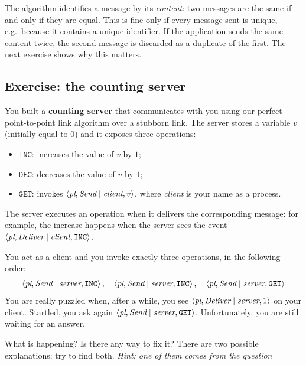 \begin{framedobs}{}
  The algorithm identifies a message by its \textit{content}: two messages are the same if and only if they are equal. This is fine only if every message sent is unique, e.g.\ because it contains a unique identifier. If the application sends the same content twice, the second message is discarded as a duplicate of the first. The next exercise shows why this matters.
\end{framedobs}

\subsection{Exercise: the counting server}

\begin{framedprob}[label={prob:counting-server}]{}
  You built a \textbf{counting server} that communicates with you using our perfect point-to-point link algorithm over a stubborn link. The server stores a variable $v$ (initially equal to $0$) and it exposes three operations:
  \begin{itemize}
    \item $\texttt{INC}$: increases the value of $v$ by $1$;
    \item $\texttt{DEC}$: decreases the value of $v$ by $1$;
    \item $\texttt{GET}$: invokes $\left\langle \textit{pl}, \textit{Send} \mid \textit{client}, v \right\rangle$, where \textit{client} is your name as a process.
  \end{itemize}
  The server executes an operation when it delivers the corresponding message: for example, the increase happens when the server sees the event $\left\langle \textit{pl}, \textit{Deliver} \mid \textit{client}, \texttt{INC} \right\rangle$.

  You act as a client and you invoke exactly three operations, in the following order:
  \[\left\langle \textit{pl}, \textit{Send} \mid \textit{server}, \texttt{INC} \right\rangle,\quad \left\langle \textit{pl}, \textit{Send} \mid \textit{server}, \texttt{INC} \right\rangle,\quad \left\langle \textit{pl}, \textit{Send} \mid \textit{server}, \texttt{GET} \right\rangle\]
  You are really puzzled when, after a while, you see $\left\langle \textit{pl}, \textit{Deliver} \mid \textit{server}, 1 \right\rangle$ on your client. Startled, you ask again $\left\langle \textit{pl}, \textit{Send} \mid \textit{server}, \texttt{GET} \right\rangle$. Unfortunately, you are still waiting for an answer.

  What is happening? Is there any way to fix it? There are two possible explanations: try to find both. \textit{Hint: one of them comes from the question }
\end{framedprob}

